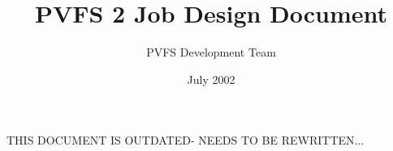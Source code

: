 \documentclass[11pt]{article} %
\title{PVFS 2 Job Design Document}
\author{PVFS Development Team}
\date{July 2002}
\begin{document}
\maketitle

THIS DOCUMENT IS OUTDATED- NEEDS TO BE REWRITTEN...
\end{document}
